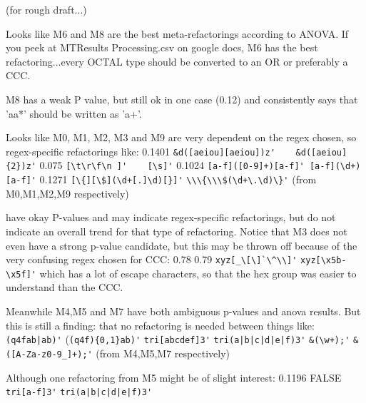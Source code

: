 (for rough draft...)

Looks like M6 and M8 are the best meta-refactorings according to ANOVA.
If you peek at MTResults Processing.csv on google docs, M6 has the best refactoring...every OCTAL type should be converted to an OR or preferably a CCC.

M8 has a weak P value, but still ok in one case (0.12) and consistently says that 'aa*' should be written as 'a+'.

Looks like M0, M1, M2, M3 and M9 are very dependent on the regex chosen, so regex-specific refactorings like:
0.1401 \verb!&d([aeiou][aeiou])z'    &d([aeiou]{2})z'!
0.075   \verb![\t\r\f\n ]'    [\s]'!
0.1024  \verb![a-f]([0-9]+)[a-f]' [a-f](\d+)[a-f]'!
0.1271  \verb![\{][\$](\d+[.]\d)[}]'!
\verb!\\\{\\\$(\d+\.\d)\}'!
(from M0,M1,M2,M9 respectively)

have okay P-values and may indicate regex-specific refactorings, but do not indicate an overall trend for that type of refactoring.
Notice that M3 does not even have a strong p-value candidate, but this may be thrown off because of the very confusing regex chosen for CCC:
0.78    0.79
\verb!xyz[_\[\]`\^\\]'!    \verb!xyz[\x5b-\x5f]'!
which has a lot of escape characters, so that the hex group was easier to understand than the CCC.



Meanwhile M4,M5 and M7 have both ambiguous p-values and anova results.  But this is still a finding: that no refactoring is needed between things like:
\verb!(q4fab|ab)'! (\verb!(q4f){0,1}ab)'!
\verb!tri[abcdef]3'!   \verb!tri(a|b|c|d|e|f)3'!
\verb!&(\w+);'!    \verb!&([A-Za-z0-9_]+);'!
(from M4,M5,M7 respectively)

Although one refactoring from M5 might be of slight interest:
0.1196  FALSE   \verb!tri[a-f]3'!  \verb!tri(a|b|c|d|e|f)3'!

